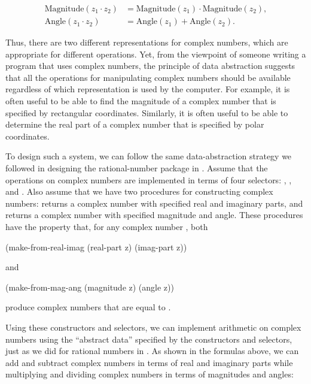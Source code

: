 $$
\begin{aligned}
	\text{Magnitude} (z_1 \cdot z_2) &= \text{Magnitude} (z_1) \cdot \text{Magnitude} (z_2), \\
	\text{Angle} (z_1 \cdot z_2) &= \text{Angle} (z_1) + \text{Angle} (z_2).
\end{aligned}
$$

\noindent
Thus, there are two different representations for complex numbers, which are
appropriate for different operations.  Yet, from the viewpoint of someone
writing a program that uses complex numbers, the principle of data abstraction
suggests that all the operations for manipulating complex numbers should be
available regardless of which representation is used by the computer.  For
example, it is often useful to be able to find the magnitude of a complex
number that is specified by rectangular coordinates.  Similarly, it is often
useful to be able to determine the real part of a complex number that is
specified by polar coordinates.

To design such a system, we can follow the same data-abstraction strategy we
followed in designing the rational-number package in .
Assume that the operations on complex numbers are implemented in terms of four
selectors: , ,  and
.  Also assume that we have two procedures for constructing complex
numbers:  returns a complex number with specified
real and imaginary parts, and  returns a complex number
with specified magnitude and angle.  These procedures have the property that,
for any complex number , both

\begin{codeBlock}
(make-from-real-imag (real-part z) (imag-part z))
\end{codeBlock}

\noindent
and

\begin{codeBlock}
(make-from-mag-ang (magnitude z) (angle z))
\end{codeBlock}

\noindent
produce complex numbers that are equal to .

Using these constructors and selectors, we can implement arithmetic on complex
numbers using the ``abstract data'' specified by the constructors and
selectors, just as we did for rational numbers in .  As
shown in the formulas above, we can add and subtract complex numbers in terms
of real and imaginary parts while multiplying and dividing complex numbers in
terms of magnitudes and angles:

